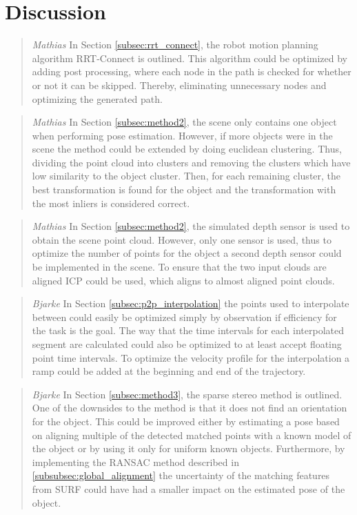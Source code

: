\documentclass[../main.tex]{subfiles}
\begin{document}
\section{Discussion} \label{sec:discussion}

\begin{quote}{\textit{Mathias}}
In Section \ref{subsec:rrt_connect}, the robot motion planning algorithm RRT-Connect is outlined. This algorithm could be optimized by adding post processing, where each node in the path is checked for whether or not it can be skipped. Thereby, eliminating unnecessary nodes and optimizing the generated path.
\end{quote}

\begin{quote}{\textit{Mathias}}
In Section \ref{subsec:method2}, the scene only contains one object when performing pose estimation. However, if more objects were in the scene the method could be extended by doing euclidean clustering. Thus, dividing the point cloud into clusters and removing the clusters which have low similarity to the object cluster. Then, for each remaining cluster, the best transformation is found for the object and the transformation with the most inliers is considered correct.
\end{quote}

\begin{quote}{\textit{Mathias}}
In Section \ref{subsec:method2}, the simulated depth sensor is used to obtain the scene point cloud. However, only one sensor is used, thus to optimize the number of points for the object a second depth sensor could be implemented in the scene. To ensure that the two input clouds are aligned ICP could be used, which aligns to almost aligned point clouds.
\end{quote}

\begin{quote}{\textit{Bjarke}}
In Section \ref{subsec:p2p_interpolation} the points used to interpolate between could easily be optimized simply by observation if efficiency for the task is the goal. The way that the time intervals for each interpolated segment are calculated could also be optimized to at least accept floating point time intervals. To optimize the velocity profile for the interpolation a ramp could be added at the beginning and end of the trajectory.
\end{quote}

\begin{quote}{\textit{Bjarke}}
In Section \ref{subsec:method3}, the sparse stereo method is outlined. One of the downsides to the method is that it does not find an orientation for the object. This could be improved either by estimating a pose based on aligning multiple of the detected matched points with  a known model of the object or by using it only for uniform known objects. Furthermore, by implementing the RANSAC method described in \ref{subsubsec:global_alignment} the uncertainty of the matching features from SURF could have had a smaller impact on the estimated pose of the object.
\end{quote}
\end{document}
